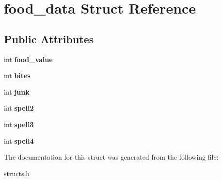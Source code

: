 \hypertarget{structfood__data}{\section{food\-\_\-data Struct Reference}
\label{structfood__data}
}
\subsection*{Public Attributes}
\begin{DoxyCompactItemize}
\item 
\hypertarget{structfood__data_aee57d73b40a6d430c9d3f57cede2b24f}{int {\bfseries food\-\_\-value}}\label{structfood__data_aee57d73b40a6d430c9d3f57cede2b24f}

\item 
\hypertarget{structfood__data_a669ba701301395c18b9a3fa1d91bd731}{int {\bfseries bites}}\label{structfood__data_a669ba701301395c18b9a3fa1d91bd731}

\item 
\hypertarget{structfood__data_a03968a2d2e00be0a73e3dee094b0daf6}{int {\bfseries junk}}\label{structfood__data_a03968a2d2e00be0a73e3dee094b0daf6}

\item 
\hypertarget{structfood__data_a6cff52d0911c9d4c3e657019eebfd5e6}{int {\bfseries spell2}}\label{structfood__data_a6cff52d0911c9d4c3e657019eebfd5e6}

\item 
\hypertarget{structfood__data_a012498bdbd43d58c2fddd522e4bfd9c5}{int {\bfseries spell3}}\label{structfood__data_a012498bdbd43d58c2fddd522e4bfd9c5}

\item 
\hypertarget{structfood__data_af2d5608e4c68d2531ec342f891c1041b}{int {\bfseries spell4}}\label{structfood__data_af2d5608e4c68d2531ec342f891c1041b}

\end{DoxyCompactItemize}


The documentation for this struct was generated from the following file\-:\begin{DoxyCompactItemize}
\item 
structs.\-h\end{DoxyCompactItemize}
